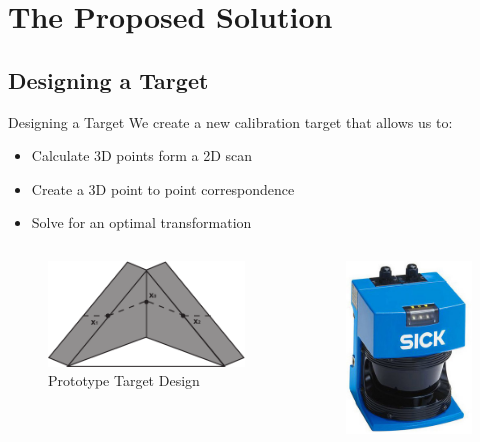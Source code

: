 \documentclass{beamer}
\begin{document}

\section{The Proposed Solution}

\subsection{Designing a Target}
\begin{frame}{Designing a Target}
    We create a new calibration target that allows us to:
    \begin{itemize}
        \item {Calculate 3D points form a 2D scan}
        \item {Create a 3D point to point correspondence}
        \item {Solve for an optimal transformation}
    \end{itemize}
    \begin{columns}[T]
        \begin{column}{.5\textwidth}
            \begin{figure}
                \centering
                \includegraphics[width=.75\textwidth]{Images/target.pdf}
                \caption{Prototype Target Design}
            \end{figure}
        \end{column}
        \begin{column}{.5\textwidth}
            \begin{figure}
                \centering
                \includegraphics[width=.3\textwidth]{Images/lasers.jpg}

\end{figure}
\end{column}
\end{columns}
\end{frame}
\end{document}

